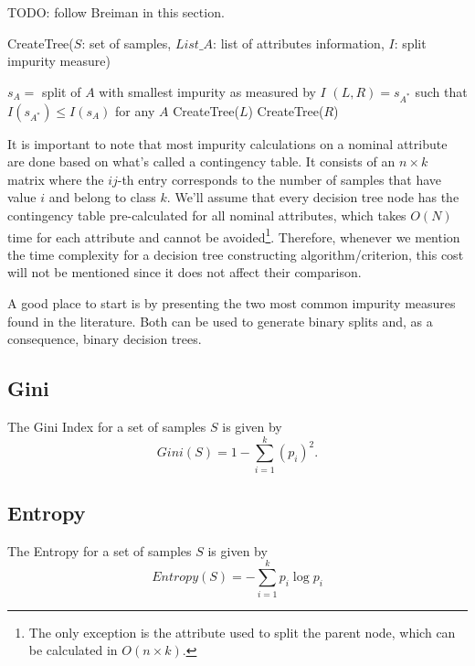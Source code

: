 TODO: follow Breiman in this section.

\begin{algorithm}[tb]
   \caption{CreateTree($S$: set of samples, $List\_A$: list of attributes information, $I$: split impurity measure)}
   \label{alg:create-tree}
\begin{algorithmic}
\STATE $s_A = $ split of $A$ with smallest impurity as measured by $I$
\ENDFOR
\STATE $(L, R) = s_{A^*}$ such that $I(s_{A^*}) \leq I(s_A) $ for any $A$
\STATE CreateTree($L$)
\STATE CreateTree($R$)
\ENDIF
\end{algorithmic}
\end{algorithm}

It is important to note that most impurity calculations on a nominal attribute are done based on what's called a contingency table. It consists of an $n\times k$ matrix where the $ij$-th entry corresponds to the number of samples that have value $i$ and belong to class $k$. We'll assume that every decision tree node has the contingency table pre-calculated for all nominal attributes, which takes $O(N)$ time for each attribute and cannot be avoided\footnote{The only exception is the attribute used to split the parent node, which can be calculated in $O(n\times k)$.}. Therefore, whenever we mention the time complexity for a decision tree constructing algorithm/criterion, this cost will not be mentioned since it does not affect their comparison.

A good place to start is by presenting the two most common impurity measures found in the literature. Both can be used to generate binary splits
and, as a consequence, binary decision trees.

\subsection{Gini}
\label{subsec:Gini}
The Gini Index for a set of samples $S$ is given by 
\begin{equation}
 Gini(S) =  1- \sum_{i=1}^k (p_i)^2 .
\label{eq:gini}
\end{equation}

\subsection{Entropy}
The Entropy for a set of samples $S$ is given by 
\begin{equation}
 Entropy(S) =  - \sum_{i=1}^k p_i \log p_i
\label{eq:entropy}
\end{equation}

